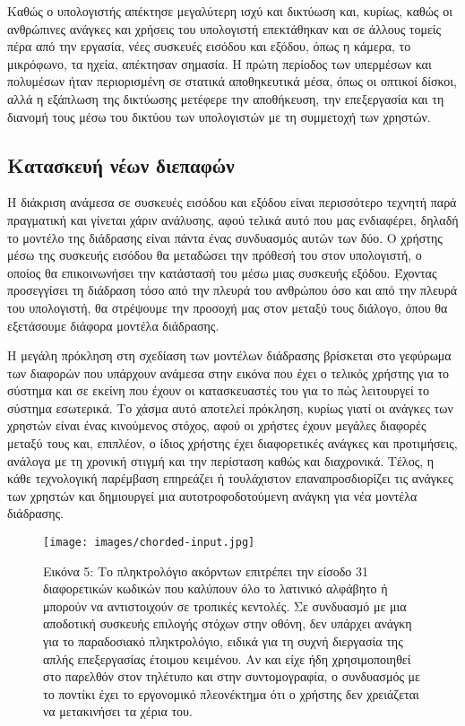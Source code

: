 \documentclass[
]{article}
\begin{document}
Καθώς ο υπολογιστής απέκτησε μεγαλύτερη ισχύ και δικτύωση και, κυρίως,
καθώς οι ανθρώπινες ανάγκες και χρήσεις του υπολογιστή επεκτάθηκαν και
σε άλλους τομείς πέρα από την εργασία, νέες συσκευές εισόδου και εξόδου,
όπως η κάμερα, το μικρόφωνο, τα ηχεία, απέκτησαν σημασία. Η πρώτη
περίοδος των υπερμέσων και πολυμέσων ήταν περιορισμένη σε στατικά
αποθηκευτικά μέσα, όπως οι οπτικοί δίσκοι, αλλά η εξάπλωση της δικτύωσης
μετέφερε την αποθήκευση, την επεξεργασία και τη διανομή τους μέσω του
δικτύου των υπολογιστών με τη συμμετοχή των χρηστών.

\hypertarget{ux3baux3b1ux3c4ux3b1ux3c3ux3baux3b5ux3c5ux3ae-ux3bdux3adux3c9ux3bd-ux3b4ux3b9ux3b5ux3c0ux3b1ux3c6ux3ceux3bd}{%
\subsection{Κατασκευή νέων
διεπαφών}\label{ux3baux3b1ux3c4ux3b1ux3c3ux3baux3b5ux3c5ux3ae-ux3bdux3adux3c9ux3bd-ux3b4ux3b9ux3b5ux3c0ux3b1ux3c6ux3ceux3bd}}

Η διάκριση ανάμεσα σε συσκευές εισόδου και εξόδου είναι περισσότερο
τεχνητή παρά πραγματική και γίνεται χάριν ανάλυσης, αφού τελικά αυτό που
μας ενδιαφέρει, δηλαδή το μοντέλο της διάδρασης είναι πάντα ένας
συνδυασμός αυτών των δύο. Ο χρήστης μέσω της συσκευής εισόδου θα
μεταδώσει την πρόθεσή του στον υπολογιστή, ο οποίος θα επικοινωνήσει την
κατάστασή του μέσω μιας συσκευής εξόδου. Έχοντας προσεγγίσει τη διάδραση
τόσο από την πλευρά του ανθρώπου όσο και από την πλευρά του υπολογιστή,
θα στρέψουμε την προσοχή μας στον μεταξύ τους διάλογο, όπου θα
εξετάσουμε διάφορα μοντέλα διάδρασης.

Η μεγάλη πρόκληση στη σχεδίαση των μοντέλων διάδρασης βρίσκεται στο
γεφύρωμα των διαφορών που υπάρχουν ανάμεσα στην εικόνα που έχει ο
τελικός χρήστης για το σύστημα και σε εκείνη που έχουν οι κατασκευαστές
του για το πώς λειτουργεί το σύστημα εσωτερικά. Το χάσμα αυτό αποτελεί
πρόκληση, κυρίως γιατί οι ανάγκες των χρηστών είναι ένας κινούμενος
στόχος, αφού οι χρήστες έχουν μεγάλες διαφορές μεταξύ τους και,
επιπλέον, ο ίδιος χρήστης έχει διαφορετικές ανάγκες και προτιμήσεις,
ανάλογα με τη χρονική στιγμή και την περίσταση καθώς και διαχρονικά.
Τέλος, η κάθε τεχνολογική παρέμβαση επηρεάζει ή τουλάχιστον
επαναπροσδιορίζει τις ανάγκες των χρηστών και δημιουργεί μια
αυτοτροφοδοτούμενη ανάγκη για νέα μοντέλα διάδρασης.

\leavevmode{}%
\begin{figure}
\hypertarget{fig:chorded-input}{%
\centering
\texttt{[image: images/chorded-input.jpg]}
\caption{Εικόνα 5: Το πληκτρολόγιο ακόρντων επιτρέπει την είσοδο 31
διαφορετικών κωδικών που καλύπουν όλο το λατινικό αλφάβητο ή μπορούν να
αντιστοιχούν σε τροπικές κεντολές. Σε συνδυασμό με μια αποδοτική
συσκευής επιλογής στόχων στην οθόνη, δεν υπάρχει ανάγκη για το
παραδοσιακό πληκτρολόγιο, ειδικά για τη συχνή διεργασία της απλής
επεξεργασίας έτοιμου κειμένου. Αν και είχε ήδη χρησιμοποιηθεί στο
παρελθόν στον τηλέτυπο και στην συντομογραφία, ο συνδυασμός με το
ποντίκι έχει το εργονομικό πλεονέκτημα ότι ο χρήστης δεν χρειάζεται να
μετακινήσει τα χέρια του.}\label{fig:chorded-input}
}
\end{figure}
\end{document}
